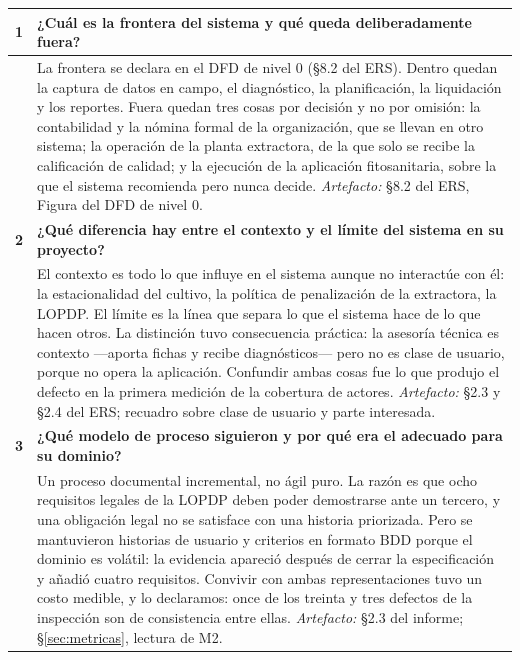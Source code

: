 \begin{longtable}{|C{0.7cm}|L{14.6cm}|}
\hline
{}\textbf{1} & \textbf{¿Cuál es la frontera del sistema y qué queda deliberadamente fuera?}\\ \hline
& La frontera se declara en el DFD de nivel 0 (\S8.2 del ERS). Dentro quedan la captura de datos en campo, el diagnóstico, la planificación, la liquidación y los reportes. Fuera quedan tres cosas por decisión y no por omisión: la contabilidad y la nómina formal de la organización, que se llevan en otro sistema; la operación de la planta extractora, de la que solo se recibe la calificación de calidad; y la ejecución de la aplicación fitosanitaria, sobre la que el sistema recomienda pero nunca decide. \newline \emph{Artefacto:} \S8.2 del ERS, Figura del DFD de nivel 0.\\ \hline
{}\textbf{2} & \textbf{¿Qué diferencia hay entre el contexto y el límite del sistema en su proyecto?}\\ \hline
& El contexto es todo lo que influye en el sistema aunque no interactúe con él: la estacionalidad del cultivo, la política de penalización de la extractora, la LOPDP. El límite es la línea que separa lo que el sistema hace de lo que hacen otros. La distinción tuvo consecuencia práctica: la asesoría técnica es contexto ---aporta fichas y recibe diagnósticos--- pero no es clase de usuario, porque no opera la aplicación. Confundir ambas cosas fue lo que produjo el defecto  en la primera medición de la cobertura de actores. \newline \emph{Artefacto:} \S2.3 y \S2.4 del ERS; recuadro sobre clase de usuario y parte interesada.\\ \hline
{}\textbf{3} & \textbf{¿Qué modelo de proceso siguieron y por qué era el adecuado para su dominio?}\\ \hline
& Un proceso documental incremental, no ágil puro. La razón es que ocho requisitos legales de la LOPDP deben poder demostrarse ante un tercero, y una obligación legal no se satisface con una historia priorizada. Pero se mantuvieron historias de usuario y criterios en formato BDD porque el dominio es volátil: la evidencia  apareció después de cerrar la especificación y añadió cuatro requisitos. Convivir con ambas representaciones tuvo un costo medible, y lo declaramos: once de los treinta y tres defectos de la inspección son de consistencia entre ellas. \newline \emph{Artefacto:} \S2.3 del informe; \S\ref{sec:metricas}, lectura de M2.\\ \hline
\end{longtable}

